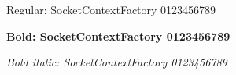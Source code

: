 \documentclass{article}
\begin{document}
{\ttfamily Regular: SocketContextFactory 0123456789\par
\bfseries Bold: SocketContextFactory 0123456789\par
\itshape Bold italic: SocketContextFactory 0123456789}
\end{document}
